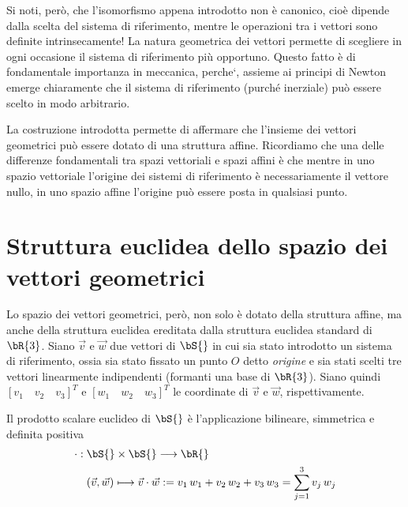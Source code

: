 \begin{figure}[h!]
\begin{center}
{\small
{}
}
\end{center}
\end{figure}

\begin{NB}
  Si noti, per\`o, che l'isomorfismo appena introdotto non \`e canonico, cio\`e 
dipende 
  dalla scelta del sistema di riferimento, mentre le operazioni tra i vettori 
sono definite
  intrinsecamente! La natura geometrica dei vettori permette di scegliere in 
ogni 
  occasione il sistema di riferimento pi\`u opportuno. Questo fatto \`e di 
fondamentale 
  importanza in meccanica, perche`, assieme ai principi di Newton emerge 
chiaramente
  che il sistema di riferimento (purch\'e inerziale) pu\`o essere scelto in modo 
arbitrario.
\end{NB}

La costruzione introdotta permette di affermare che l'insieme dei vettori 
geometrici pu\`o 
essere dotato di una struttura affine. Ricordiamo che una delle differenze 
fondamentali
tra spazi vettoriali e spazi affini \`e che mentre in uno spazio vettoriale 
l'origine dei sistemi
di riferimento \`e necessariamente il vettore nullo, in uno spazio affine 
l'origine pu\`o
essere posta in qualsiasi punto.

\section{Struttura euclidea dello spazio dei vettori geometrici}
Lo spazio dei vettori geometrici, per\`o, non solo \`e dotato della struttura 
affine, 
ma anche della struttura euclidea ereditata dalla struttura euclidea standard di
$\bR{3}$. Siano $\vec v$ e $\vec w$ due vettori di $\bS{}$ in cui sia stato 
introdotto 
un sistema di riferimento, ossia sia stato fissato un punto $O$ detto {\it 
origine} e 
sia stati scelti tre vettori linearmente indipendenti (formanti una base di 
$\bR{3}$).
Siano quindi $[v_1\quad v_2\quad v_3]^T$ e $[w_1\quad w_2\quad w_3]^T$ le 
coordinate
di $\vec v$ e $\vec w$, rispettivamente. 

\begin{definition}
  Il prodotto scalare euclideo di $\bS{}$ \`e l'applicazione bilineare, 
simmetrica 
  e definita positiva
  \[\begin{aligned}
    \cdot : & \; \bS{}\times\bS{} \longrightarrow \bR{} \\
         & \; (\vec v,\vec w) \longmapsto \vec v\cdot \vec w := v_1\,w_1 + 
v_2\,w_2 + v_3\,w_3 
         = \sum_{j=1}^3 v_j\,w_j
  \end{aligned}\]
\end{definition}

